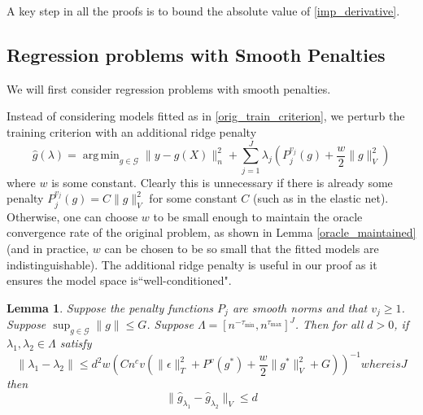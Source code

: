 \documentclass[12pt]{article}
\newtheorem{lemma}{Lemma}
\DeclareMathOperator*{\argmin}{arg\,min}
\begin{document}
A key step in all the proofs is to bound the absolute value of \eqref{imp_derivative}.

\subsection{Regression problems with Smooth Penalties}
\label{sec:entropy_1}

We will first consider regression problems with smooth penalties.

Instead of considering models fitted as in \eqref{orig_train_criterion}, we perturb the training criterion with an additional ridge penalty
\begin{equation}
\label{train_crit_ridge}
\hat{g}(\lambda) = \argmin_{g\in \mathcal{G}} \| y -  g(X) \|^2_n + \sum_{j=1}^J \lambda_j \left ( P^{v_j}_j(g) + \frac{w}{2} \| g \|^2_V \right )
\end{equation}
where $w$ is some constant. Clearly this is unnecessary if there is already some penalty $P^{v_j}_j(g) = C \| g \|_V^2$ for some constant $C$ (such as in the elastic net). Otherwise, one can choose $w$ to be small enough to maintain the oracle convergence rate of the original problem, as shown in Lemma \ref{oracle_maintained} (and in practice, $w$ can be chosen to be so small that the fitted models are indistinguishable). The additional ridge penalty is useful in our proof as it ensures the model space is``well-conditioned".

\begin{lemma}
\label{smooth_entropy_lemma}
Suppose the penalty functions $P_j$ are smooth norms and that $v_j \ge 1$. Suppose $\sup_{g \in \mathcal{G}} \|g\| \le G$. 
Suppose $\Lambda = [n^{- \tau_{\min}} , n^{\tau_{\max}}]^J$.
Then for all $d > 0$, if $\lambda_1, \lambda_2 \in \Lambda$ satisfy
\begin{equation}
\label{lambda_close_condition}
\| \lambda_1 -  \lambda_2 \| \le  d^2 w \left ( Cn^{c}v\left(\|\epsilon\|_{T}^{2}+P^{v}(g^{*})+\frac{w}{2}\|g^{*}\|_V^{2}+G\right) \right )^{-1} whereisJ
\end{equation}
then
\begin{equation}
\| \hat{g}_{\lambda_1} -  \hat{g}_{\lambda_2} \|_V \le d
\end{equation}
\end{lemma}
\end{document}
